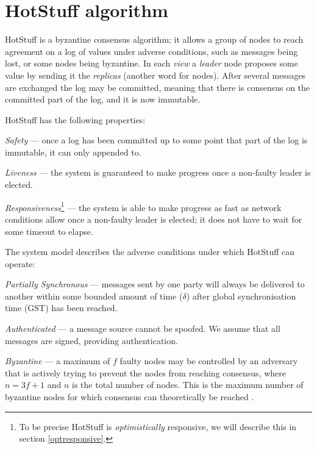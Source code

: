 \section{HotStuff algorithm} \label{hotstufftheory}
HotStuff is a byzantine consensus algorithm; it allows a group of nodes to reach agreement on a log of values under adverse conditions, such as messages being lost, or some nodes being byzantine. In each \textit{view} a \textit{leader} node proposes some value by sending it the \textit{replicas} (another word for nodes). After several messages are exchanged the log may be committed, meaning that there is consensus on the committed part of the log, and it is now immutable.

HotStuff has the following properties:
\begin{description}
	\item \textit{Safety} --- once a log has been committed up to some point that part of the log is immutable, it can only appended to.
	\item \textit{Liveness} --- the system is guaranteed to make progress once a non-faulty leader is elected.
	\item \textit{Responsiveness}\footnote{To be precise HotStuff is \textit{optimistically} responsive, we will describe this in section \ref{optresponsive}.} --- the system is able to make progress as fast as network conditions allow once a non-faulty leader is elected; it does not have to wait for some timeout to elapse.
\end{description}

The system model describes the adverse conditions under which HotStuff can operate:
\begin{description}
	\item \textit{Partially Synchronous} --- messages sent by one party will always be delivered to another within some bounded amount of time ($\delta$) after global synchronisation time (GST) has been reached.
	\item \textit{Authenticated} --- a message source cannot be spoofed. We assume that all messages are signed, providing authentication.
	\item \textit{Byzantine} --- a maximum of $f$ faulty nodes may be controlled by an adversary that is actively trying to prevent the nodes from reaching consensus, where $n = 3f + 1$ and $n$ is the total number of nodes. This is the maximum number of byzantine nodes for which consensus can theoretically be reached \cite{peaseReachingAgreementPresence1980}\cite{fischerEasyImpossibilityProofs1986}.
\end{description}

